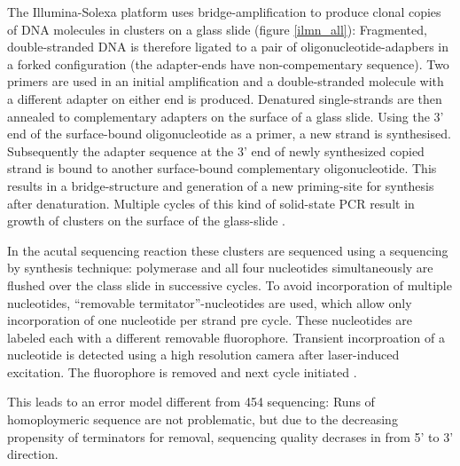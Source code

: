 
The Illumina-Solexa platform uses bridge-amplification to produce
clonal copies of DNA molecules in clusters on a glass slide (figure
\ref{ilmn_all}): Fragmented, double-stranded DNA is therefore ligated to
a pair of oligonucleotide-adapbers in a forked configuration (the
adapter-ends have non-compementary sequence). Two primers are used in
an initial amplification and a double-stranded molecule with a
different adapter on either end is produced. Denatured single-strands
are then annealed to complementary adapters on the surface of a glass
slide. Using the 3' end of the surface-bound oligonucleotide as a
primer, a new strand is synthesised. Subsequently the adapter sequence
at the 3' end of newly synthesized copied strand is bound to another
surface-bound complementary oligonucleotide. This results in a
bridge-structure and generation of a new priming-site for synthesis
after denaturation. Multiple cycles of this kind of solid-state PCR
result in growth of clusters on the surface of the glass-slide
\cite{pmid18987734}.

In the acutal sequencing reaction these clusters are sequenced using a
sequencing by synthesis technique: polymerase and all four nucleotides
simultaneously are flushed over the class slide in successive
cycles. To avoid incorporation of multiple nucleotides, ``removable
termitator''-nucleotides are used, which allow only incorporation of
one nucleotide per strand pre cycle. These nucleotides are labeled
each with a different removable fluorophore. Transient incorproation
of a nucleotide is detected using a high resolution camera after
laser-induced excitation. The fluorophore is removed and next cycle
initiated \cite{pmid18987734}.

This leads to an error model different from 454 sequencing: Runs of
homoploymeric sequence are not problematic, but due to the decreasing
propensity of terminators for removal, sequencing quality decrases in
from 5' to 3' direction.

